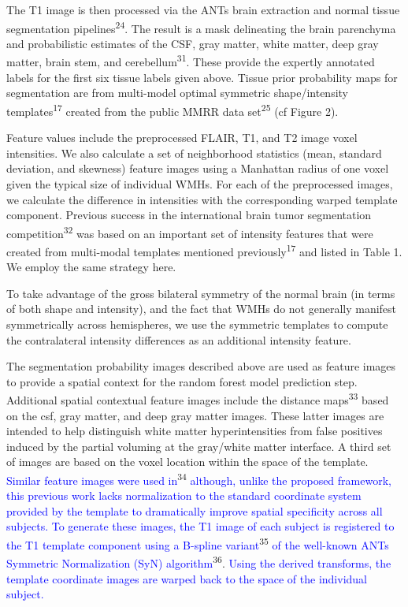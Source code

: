 \documentclass[11pt,]{article}
\begin{document}
The T1 image is then processed via the ANTs brain extraction and normal
tissue segmentation pipelines\textsuperscript{24}. The result is a mask
delineating the brain parenchyma and probabilistic estimates of the CSF,
gray matter, white matter, deep gray matter, brain stem, and
cerebellum\textsuperscript{31}. These provide the expertly annotated
labels for the first six tissue labels given above. Tissue prior
probability maps for segmentation are from multi-model optimal symmetric
shape/intensity templates\textsuperscript{17} created from the public
MMRR data set\textsuperscript{25} (cf Figure 2).

Feature values include the preprocessed FLAIR, T1, and T2 image voxel
intensities. We also calculate a set of neighborhood statistics (mean,
standard deviation, and skewness) feature images using a Manhattan
radius of one voxel given the typical size of individual WMHs. For each
of the preprocessed images, we calculate the difference in intensities
with the corresponding warped template component. Previous success in
the international brain tumor segmentation
competition\textsuperscript{32} was based on an important set of
intensity features that were created from multi-modal templates
mentioned previously\textsuperscript{17} and listed in Table 1. We
employ the same strategy here.

To take advantage of the gross bilateral symmetry of the normal brain
(in terms of both shape and intensity), and the fact that WMHs do not
generally manifest symmetrically across hemispheres, we use the
symmetric templates to compute the contralateral intensity differences
as an additional intensity feature.

The segmentation probability images described above are used as feature
images to provide a spatial context for the random forest model
prediction step. Additional spatial contextual feature images include
the distance maps\textsuperscript{33} based on the csf, gray matter, and
deep gray matter images. These latter images are intended to help
distinguish white matter hyperintensities from false positives induced
by the partial voluming at the gray/white matter interface. A third set
of images are based on the voxel location within the space of the
template.
\textcolor{blue}{Similar feature images were used in}\textsuperscript{34}
\textcolor{blue}{although, unlike the proposed framework, this previous work lacks
normalization to the standard
coordinate system provided by the template to dramatically improve spatial specificity
across all subjects.  To generate these images, the T1 image of each subject is
registered to the T1 template component using a B-spline variant}\textsuperscript{35}
\textcolor{blue}{of the well-known ANTs Symmetric Normalization (SyN) algorithm}\textsuperscript{36}.
\textcolor{blue}{Using the derived transforms, the template coordinate images are warped back to the space of the individual subject.}
\end{document}
